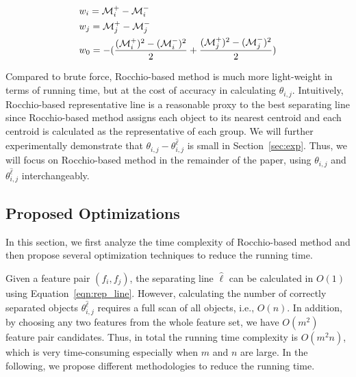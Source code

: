 
\begin{equation}\label{eqn:rep_line}
\begin{split}
& w_i = \mm_i^+-\mm_i^- \\
& w_j = \mm_j^+-\mm_j^- \\
& w_0 = -(\frac{(\mm_i^+)^2-(\mm_i^-)^2}{2}+\frac{(\mm_j^+)^2-(\mm_j^-)^2}{2})
\end{split}
\end{equation}


 Compared to brute force, Rocchio-based method is much more light-weight in terms of running time, but at the cost of accuracy in calculating $\theta_{i,j}$. Intuitively, Rocchio-based representative line is a reasonable proxy to the best separating line since Rocchio-based method assigns each object to its nearest centroid and each centroid is calculated as the representative of each group. We will further experimentally demonstrate that $\theta_{i,j}-\theta_{i,j}^{\hat{\ell}}$ is small in Section~\ref{sec:exp}.
Thus, we will focus on Rocchio-based method in the remainder of the paper, using $\theta_{i,j}$ and $\theta_{i,j}^{\hat{\ell}}$ interchangeably.

\subsection{Proposed Optimizations}\label{sec:opt}
 In this section, we first analyze the time complexity of Rocchio-based method and then propose several optimization techniques to reduce the running time. 

 Given a feature pair $(f_i, f_j)$, the separating line $\hat{\ell}$ can be calculated in $O(1)$ using Equation~\ref{eqn:rep_line}. However, calculating the number of correctly separated objects $\theta_{i,j}^{\hat{\ell}}$ requires a full scan of all objects, i.e., $O(n)$. In addition, by choosing any two features from the whole feature set, we have $O(m^2)$ feature pair candidates. Thus, in total the running time complexity is $O(m^2n)$, which is very time-consuming especially when $m$ and $n$ are large. In the following, we propose different methodologies to reduce the running time.

